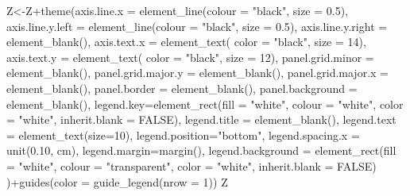 \documentclass[
]{book}
\newenvironment{Shaded}{\begin{snugshade}}{\end{snugshade}}
\newcommand{\AttributeTok}[1]{\textcolor[rgb]{0.77,0.63,0.00}{#1}}
\newcommand{\ConstantTok}[1]{\textcolor[rgb]{0.00,0.00,0.00}{#1}}
\newcommand{\DecValTok}[1]{\textcolor[rgb]{0.00,0.00,0.81}{#1}}
\newcommand{\FloatTok}[1]{\textcolor[rgb]{0.00,0.00,0.81}{#1}}
\newcommand{\FunctionTok}[1]{\textcolor[rgb]{0.00,0.00,0.00}{#1}}
\newcommand{\NormalTok}[1]{#1}
\newcommand{\OtherTok}[1]{\textcolor[rgb]{0.56,0.35,0.01}{#1}}
\newcommand{\SpecialCharTok}[1]{\textcolor[rgb]{0.00,0.00,0.00}{#1}}
\newcommand{\StringTok}[1]{\textcolor[rgb]{0.31,0.60,0.02}{#1}}
\begin{document}
\begin{Shaded}
\begin{Highlighting}[]
\NormalTok{Z}\OtherTok{\textless{}{-}}\NormalTok{Z}\SpecialCharTok{+}\FunctionTok{theme}\NormalTok{(}\AttributeTok{axis.line.x =} \FunctionTok{element\_line}\NormalTok{(}\AttributeTok{colour =} \StringTok{"black"}\NormalTok{, }\AttributeTok{size =} \FloatTok{0.5}\NormalTok{),}
           \AttributeTok{axis.line.y.left  =} \FunctionTok{element\_line}\NormalTok{(}\AttributeTok{colour =} \StringTok{"black"}\NormalTok{, }\AttributeTok{size =} \FloatTok{0.5}\NormalTok{),}
           \AttributeTok{axis.line.y.right =} \FunctionTok{element\_blank}\NormalTok{(),}
           \AttributeTok{axis.text.x =} \FunctionTok{element\_text}\NormalTok{( }\AttributeTok{color =} \StringTok{"black"}\NormalTok{, }\AttributeTok{size =} \DecValTok{14}\NormalTok{),}
           \AttributeTok{axis.text.y =} \FunctionTok{element\_text}\NormalTok{( }\AttributeTok{color =} \StringTok{"black"}\NormalTok{, }\AttributeTok{size =} \DecValTok{12}\NormalTok{),}
           \AttributeTok{panel.grid.minor =} \FunctionTok{element\_blank}\NormalTok{(),}
           \AttributeTok{panel.grid.major.y =} \FunctionTok{element\_blank}\NormalTok{(),}
           \AttributeTok{panel.grid.major.x =} \FunctionTok{element\_blank}\NormalTok{(),}
           \AttributeTok{panel.border =} \FunctionTok{element\_blank}\NormalTok{(),}
           \AttributeTok{panel.background =} \FunctionTok{element\_blank}\NormalTok{(),}
           \AttributeTok{legend.key=}\FunctionTok{element\_rect}\NormalTok{(}\AttributeTok{fill =} \StringTok{"white"}\NormalTok{, }\AttributeTok{colour =} \StringTok{"white"}\NormalTok{,}
                                   \AttributeTok{color =} \StringTok{"white"}\NormalTok{, }\AttributeTok{inherit.blank =} \ConstantTok{FALSE}\NormalTok{),}
           \AttributeTok{legend.title =} \FunctionTok{element\_blank}\NormalTok{(),}
           \AttributeTok{legend.text  =} \FunctionTok{element\_text}\NormalTok{(}\AttributeTok{size=}\DecValTok{10}\NormalTok{),}
           \AttributeTok{legend.position=}\StringTok{"bottom"}\NormalTok{,}
           \AttributeTok{legend.spacing.x =} \FunctionTok{unit}\NormalTok{(}\FloatTok{0.10}\NormalTok{, }\StringTok{\textquotesingle{}cm\textquotesingle{}}\NormalTok{),}
           \AttributeTok{legend.margin=}\FunctionTok{margin}\NormalTok{(),}
           \AttributeTok{legend.background =} \FunctionTok{element\_rect}\NormalTok{(}\AttributeTok{fill =} \StringTok{"white"}\NormalTok{, }\AttributeTok{colour =} \StringTok{"transparent"}\NormalTok{,}
                                            \AttributeTok{color =} \StringTok{"white"}\NormalTok{, }\AttributeTok{inherit.blank =} \ConstantTok{FALSE}\NormalTok{)}
\NormalTok{)}\SpecialCharTok{+}\FunctionTok{guides}\NormalTok{(}\AttributeTok{color =} \FunctionTok{guide\_legend}\NormalTok{(}\AttributeTok{nrow =} \DecValTok{1}\NormalTok{))}
\NormalTok{Z}
\end{Highlighting}
\end{Shaded}
\end{document}
